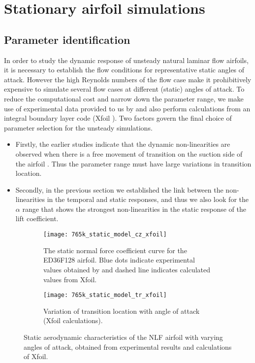 \section{Stationary airfoil simulations}

\subsection{Parameter identification}

In order to study the dynamic response of unsteady natural laminar flow airfoils, it is necessary to establish the flow conditions for representative static angles of attack. However the high Reynolds numbers of the flow case make it prohibitively expensive to simulate several flow cases at different (static) angles of attack. To reduce the computational cost and narrow down the parameter range, we make use of experimental data provided to us by \cite{lokattthesis} and also perform calculations from an integral boundary layer code (Xfoil \cite{drela89}). Two factors govern the final choice of parameter selection for the unsteady simulations. 
\begin{itemize}
	\item Firstly, the earlier studies indicate that the dynamic non-linearities are observed when there is a free movement of transition on the suction side of the airfoil \citep{mai11,hebler13,lokattthesis}. Thus the parameter range must have large variations in transition location.  
	\item Secondly, in the previous section we established the link between the non-linearities in the temporal and static responses, and thus we also look for the $\alpha$ range that shows the strongest non-linearities in the static response of the lift coefficient.
\end{itemize}
\begin{figure}[h]
	\centering
	\begin{subfigure}[t]{0.48\textwidth}
		\texttt{[image: 765k\_static\_model\_cz\_xfoil]}
		\caption{The static normal force coefficient curve for the ED36F128 airfoil. Blue dots indicate experimental values obtained by \cite{lokattthesis} and dashed line indicates calculated values from Xfoil.}
		\label{fig:cz_static_xfoil}
	\end{subfigure}
	\begin{subfigure}[t]{0.48\textwidth}
		\texttt{[image: 765k\_static\_model\_tr\_xfoil]}
		\caption{Variation of transition location with angle of attack (Xfoil calculations).}
		\label{fig:tr_static_xfoil}
	\end{subfigure}	
	\caption{Static aerodynamic characteristics of the NLF airfoil with varying angles of attack, obtained from experimental results and calculations of Xfoil.}
	\label{fig:static_characteristics}
\end{figure}
